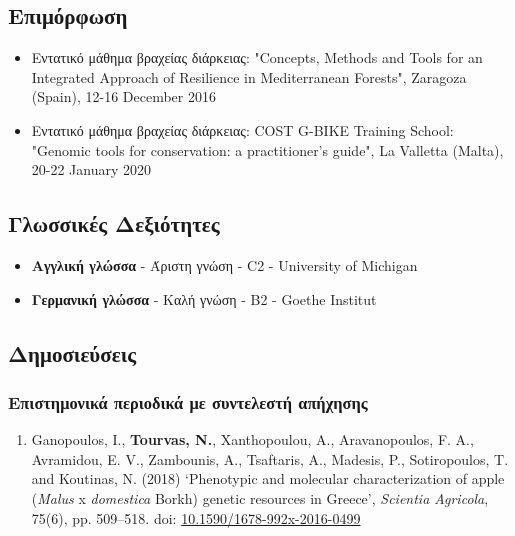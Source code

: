 \documentclass[12pt,]{scrartcl}
\begin{document}
\subsection{Επιμόρφωση}\label{courses}
\begin{itemize}
\vspace{-3mm}
\setlength\itemsep{-0.6em}
\item Εντατικό μάθημα βραχείας διάρκειας: "Concepts, Methods and Tools for an Integrated Approach of Resilience in Mediterranean Forests", Zaragoza (Spain), 12-16 December 2016

\item Εντατικό μάθημα βραχείας διάρκειας:
COST G-BIKE Training School: "Genomic tools for conservation: a practitioner’s guide", La Valletta (Malta), 20-22 January 2020
\end{itemize}

\subsection{Γλωσσικές Δεξιότητες}\label{Γλώσσες}
\begin{itemize}
\vspace{-3mm}
%
\setlength\itemsep{-0.6em}
\item \textbf{Αγγλική γλώσσα} - Άριστη γνώση - C2 - University of Michigan

\item \textbf{Γερμανική γλώσσα} - Καλή γνώση - Β2 - Goethe Institut
\end{itemize}

\newpage


\subsection{Δημοσιεύσεις}\label{publications}

\subsubsection{Επιστημονικά περιοδικά με συντελεστή απήχησης}\label{journals}
\vspace{-3mm}
\begin{enumerate}

\leftskip-0.07in

\item Ganopoulos, I., \textbf{Tourvas, N.}, Xanthopoulou, A., Aravanopoulos, F. A., Avramidou, E. V., Zambounis, A., Tsaftaris, A., Madesis, P., Sotiropoulos, T. and Koutinas, N. (2018) ‘Phenotypic and molecular characterization of apple (\textit{Malus} x \textit{domestica} Borkh) genetic resources in Greece’, \textit{Scientia Agricola}, 75(6), pp. 509–518. doi: \href{http://dx.doi.org/10.1590/1678-992x-2016-0499}{10.1590/1678-992x-2016-0499}


\end{enumerate}
\end{document}
